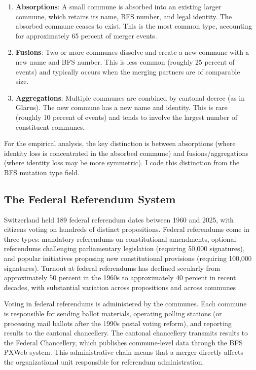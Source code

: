 \documentclass[12pt]{article}
\begin{document}
\begin{enumerate}
    \item \textbf{Absorptions}: A small commune is absorbed into an existing larger commune, which retains its name, BFS number, and legal identity. The absorbed commune ceases to exist. This is the most common type, accounting for approximately 65 percent of merger events.

    \item \textbf{Fusions}: Two or more communes dissolve and create a new commune with a new name and BFS number. This is less common (roughly 25 percent of events) and typically occurs when the merging partners are of comparable size.

    \item \textbf{Aggregations}: Multiple communes are combined by cantonal decree (as in Glarus). The new commune has a new name and identity. This is rare (roughly 10 percent of events) and tends to involve the largest number of constituent communes.
\end{enumerate}

For the empirical analysis, the key distinction is between absorptions (where identity loss is concentrated in the absorbed commune) and fusions/aggregations (where identity loss may be more symmetric). I code this distinction from the BFS mutation type field.

\subsection{The Federal Referendum System}

Switzerland held 189 federal referendum dates between 1960 and 2025, with citizens voting on hundreds of distinct propositions. Federal referendums come in three types: mandatory referendums on constitutional amendments, optional referendums challenging parliamentary legislation (requiring 50,000 signatures), and popular initiatives proposing new constitutional provisions (requiring 100,000 signatures). Turnout at federal referendums has declined secularly from approximately 50 percent in the 1960s to approximately 40 percent in recent decades, with substantial variation across propositions and across communes \citep{kriesi2005direct}.

Voting in federal referendums is administered by the communes. Each commune is responsible for sending ballot materials, operating polling stations (or processing mail ballots after the 1990s postal voting reform), and reporting results to the cantonal chancellery. The cantonal chancellery transmits results to the Federal Chancellery, which publishes commune-level data through the BFS PXWeb system. This administrative chain means that a merger directly affects the organizational unit responsible for referendum administration.
\end{document}
